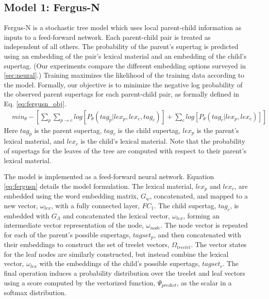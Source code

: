 \documentclass[11pt]{article}
\begin{document}
\subsection{Model 1: Fergus-N}

Fergus-N is a stochastic tree model which uses local parent-child information as inputs to a feed-forward network.
%
Each parent-child pair is treated as independent of all others.
%
The probability of the parent's supertag is predicted using an embedding of the pair's lexical material and an embedding of the child's supertag.
%
(Our experiments compare the different embedding options surveyed in
\ref{sec:neural}.) 
%
Training maximizes the likelihood of the training data according to
the model.
%
Formally, our objective is to minimize the negative log probability of
the observed parent supertags for each parent-child pair, as formally
defined in Eq. \ref{eq:fergusn_obj}.
%
\begin{align}
&min_{\theta} -[\sum_p\sum_{p\to c} log[P_\theta(tag_{p} | lex_{p}, lex_{c}, tag_{c})] + \sum_c log[P_\theta(tag_{c} |lex_{p}, lex_{c})]] \label{eq:fergusn_obj}
\end{align}
%
Here $tag_p$ is the parent
supertag, $tag_c$ is the child supertag, $lex_p$ is the parent's
lexical material, and $lex_c$ is the child's lexical material.
%
Note that the probability of supertags for the leaves of the tree are computed
with respect to their parent's lexical material.

The model is implemented as a feed-forward neural network.
%
Equation \ref{eq:fergusn} details the model formulation.
%
The lexical material, $lex_p$ and $lex_c$, are embedded using the word embedding matrix, $G_w$, concatenated, and mapped to a new vector, $\omega_{lex}$, with a fully connected layer, $FC_1$.
%
The child supertag, $tag_c$, is embedded with $G_\Lambda$ and concatenated the lexical vector, $\omega_{lex}$, forming an intermediate vector representation of the node, $\omega_{node}$.
%
The node vector is repeated for each of the parent's possible supertags, $tagset_p$, and then concatenated with their embeddings to construct the set of treelet vectors, $\Omega_{treelet}$.
%
The vector states for the leaf nodes are similarly constructed, but instead combine the lexical vector, $\omega_{lex}$ with the embeddings of the child's possible supertags, $tagset_c$.
%
The final operation induces a probability distribution over the treelet and leaf vectors using a score computed by the vectorized function, $\Psi_{predict}$, as the scalar in a softmax distribution. 
\end{document}

